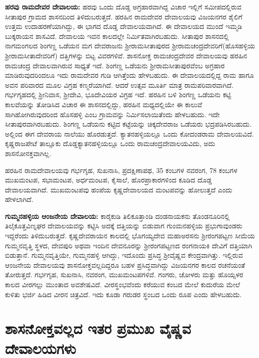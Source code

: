 \textbf{ಹರವು ರಾಮದೇವರ ದೇವಾಲಯ:} ಹರವು ಒಂದು ದೊಡ್ಡ ಅಗ್ರಹಾರವಾಗಿದ್ದ ವಿಚಾರ ಇಲ್ಲಿಗೆ ಸಮೀಪದಲ್ಲಿರುವ ಸೀತಾಪುರ ಗ್ರಾಮದ ಶಾಸನದಿಂದ ತಿಳಿದುಬರುತ್ತದೆ. ಹರಹಿನ ರಾಮದೇವರ ದೇವಾಲಯವು ವಿಜಯನಗರ ಶೈಲಿಗೆ ಉತ್ತಮ ಉದಾಹರಣೆಯಾಗಿದ್ದು, ಈ ಭಾಗದ ದೊಡ್ಡ ದೇವಾಲಯವಾಗಿದೆ. ಈ ದೇವಾಲಯದ ಮುಂದೆ ಇಮ್ಮಡಿ ಬುಕ್ಕರಾಯನ ಶಾಸವಿದೆ. ದೇವಾಲಯ ಇವನ ಕಾಲದಲ್ಲೇ ನಿರ್ಮಿತವಾಗಿರಬಹುದು. ಸೀತಾಪುರ ಶಾಸನದಲ್ಲಿ ನಾಗಮಂಗಲದ ಶಿಂಗಣ್ಣ ಒಡೆಯನ ಮಗ ದೇವರಾಜನು ಶ‍್ರೀರಾಮಸೀತಾಪುರದ ಶ‍್ರೀರಾಮಚಂದ್ರದೇವರಿಗೆ(ಹೊಸಹಳ್ಳಿಯ ಶ‍್ರೀರಾಮಸೀತಾದೇವರಿಗೆ) ದತ್ತಿಗಳನ್ನು ಬಿಟ್ಟ ವಿವರಗಳಿವೆ. ಶಾಸನೋಕ್ತ ರಾಮಚಂದ್ರದೇವರ ದೇವಾಲಯವು ಹರಹಿನ ರಾಮಚಂದ್ರ ದೇವಾಲವಾಗಿರುವ ಸಾಧ್ಯತೆ ಇದೆ. ಶಿಂಗಣ್ಣ ಒಡೆಯನು ಶ‍್ರೀರಾಮಸೀತಾಪುರವೆಂಬ ಅಗ್ರಹಾರ ಮಾಡಿರುವುದರಿಂದಲೂ ಇದು ರಾಮದೇವರ ಗುಡಿ ಆಗಿತ್ತೆಂದು ಹೇಳಬಹುದು. ಈ ದೇವಾಲಯದಲ್ಲಿದ್ದ ರಾಮ ಹಾಗೂ ಅವನ ಪರಿವಾರದ ಮೂಲ ವಿಗ್ರಹ ಕಣ್ಮರೆಯಾಗಿದೆ. ಆದರೆ ಉತ್ಸವ ಮೂರ್ತಿ ಮಾತ್ರ ರಾಮಪರಿವಾರವಾಗಿದೆ. ಗರ್ಭಗೃಹದಲ್ಲಿ ಶ‍್ರೀನಿವಾಸ, ಶ‍್ರೀದೇವಿ, ಭೂದೇವಿಯರ ವಿಗ್ರಹ ಇದೆ. ಹರಹಿನ ಬಳಿ ಶಿಂಗಣ್ಣ ಒಡೆಯನು ಕಟ್ಟಿ ಕಾಲವೆಯನ್ನು ತೋಡಿಸಿದ ವಿಚಾರ ಈ ಶಾಸನದಲ್ಲಿದ್ದು, ಹರಹಿನ ಮಧ್ಯದಲ್ಲಿಯೇ ಈ ಕಾಲುವೆ ಸಾಗಿಹೋಗಿರುವುದರಿಂದ ಹೊಸಹಳ್ಳಿ ಎಂಬ ಗ್ರಾಮವನ್ನು ನಿರ್ಮಿಸಲಾಯಿತೆಂದು ಹೇಳಬಹುದು. ಇದೇ ಸೀತಾಪುರವಾಗಿರಬಹುದು. ಶಿಂಗಣ್ಣ ಒಡೆಯನು ಕಟ್ಟಿದ ಕಟ್ಟೆಯನ್ನು ಚಿಕ್ಕದೇವರಾಜ ಒಡೆಯರು ಭದ್ರಪಡಿಸಿರಬಹುದು. ಅಲ್ಲಿಂದ ಈಗ ದೇವರಾಯ ನಾಲೆಯು ಹೊರಡುತ್ತದೆ. ಕ್ಯಾತನಹಳ್ಳಿಯಲ್ಲೂ ಒಂದು ಕೋದಂಡರಾಮ ದೇವಾಲಯವಿದೆ. ಕೃಷ್ಣರಾಜಪೇಟೆ ತಾಲ್ಲೂಕು ದೊಡ್ಡಕ್ಯಾತನಹಳ್ಳಿಯಲ್ಲೂ ಒಂದು ರಾಮಚಂದ್ರದೇವಾಲಯವಿದು, ಅದು ಶಾಸನೋನಕ್ತವಾಗಿಲ್ಲ.

ಹರಹಿನ ರಾಮದೇವಾಲಯವು ಗರ್ಭಗೃಹ, ಸುಖನಾಸಿ, ಪ್ರದಕ್ಷಿಣಾಪಥ, 35 ಕಂಬಗಳ ನವರಂಗ, 78 ಕಂಬಗಳ ಮುಖಮಂಟಪ, ಸಭಾಮಂಟಪ, ಅರ್ಧಮಂಟಪ, ಕೈಸಾಲೆ, ಹೊರಪ್ರಾಕಾರಗಳಿಂದ ಕೂಡಿದ ದೊಡ್ಡ ದೇವಾಲಯವಾಗಿದೆ. ಮುಖಮಂಟಪವು ಹಂಪೆಯ ಕೃಷ್ಣದೇವಾಲಯದ ಮಂಟಪವನ್ನು ಹೋಲುತ್ತದೆ ಎಂದು ಹೇಳಲಾಗಿದೆ.

\textbf{ಗುಮ್ಮನಹಳ್ಳಿಯ ಆಂಜನೇಯ ದೇವಾಲಯ: } ಕಾರೈಕುಡಿ ತಿಲಿಕೂತ್ತಾಂಡಿ ದಂಡನಾಯಕನು ತೊಂಡನೂರಿನಲ್ಲಿ ತಿಲೈಕೂತ್ತವಿಣ್ನಘರ ದೇವಾಲಯವನ್ನು ಕಟ್ಟಿಸಿ ಅದಕ್ಕೆ ದತ್ತಿಯನ್ನು ಬಿಡುವಾಗ ಗುಂಮನಹಳ್ಳಿಯ ಪ್ರಭುಗಾವುಂಡರು ಇದ್ದರೆಂದು ತಿಳಿದುಬರುತ್ತದೆ. ಕೃಷ್ಣದೇವರಾಯನ ಕಾಲದಲ್ಲಿ ಭೊಗಯ್ಯದೇವ ಮಹಾಅರಸನು ಶ‍್ರೀರಂಗಪಟ್ಟಣ ಸೀಮೆಯ ಗುಮ್ಮನವೃತ್ತಿ ಸ್ಥಳದ, ದೇವಪುರಿ ಅಥವಾ ಇಂದಿನ ದೇವನೂರನ್ನು ಶ‍್ರೀರಂಗಪಟ್ಟಣದ ರಂಗನಾಯಕಿ ದೇವಿಗೆ ದತ್ತಿಯಾಗಿ ಬಿಡುತ್ತಾನೆ. ಗುಮ್ಮನವೃತ್ತಿಯೇ, ಗುಮ್ಮನಹಳ್ಳಿ ಆಗಿದ್ದು, ಇದೊಂದು ಪ್ರಸಿದ್ಧ ಶ‍್ರೀವೈಷ್ಣವ ಕೇಂದ್ರವಾಗಿತ್ತು. ಇಲ್ಲಿರುವ ಆಂಜನೇಯ ದೇವಾಲಯವು ಶಾಸನೋಕ್ತವಲ್ಲದಿದ್ದರೂ ಬಹಳ ಪ್ರಸಿದ್ಧವಾಗಿದ್ದು ವಿಜಯನಗರ ಕಾಲದ ರಚನೆಯಂತೆ ತೋರುತ್ತದೆ. ಗರ್ಭಗೃಹ, ಸುಖನಾಸಿ, ನವರಂಗ, ಮುಖಮಂಟಪಗಳಿವೆ. ಗಂಗರು, ಚೋಳರು ಮತ್ತು ಹೊಯ್ಸಳರ ಕಾಲದ ವೀರಗಲ್ಲು ಮುಂತಾದ ಅವಶೇಷವಿದೆ. ವೀರಸ್ಥಂಭವೆಂದು ಕರೆಯುವ ಕಂಬದ ಮೇಲೆ ಕುದುರೆಯ ಮೇಲೆ ಕುಳಿತು ಭರ್ಜಿ ಹಿಡಿದ ವೀರನ ಚಿತ್ರವಿದೆ. ಇದು ಕೂಡಾ ಗರುಡರ ಸ್ಥಂಬದ ಒಂದು ರೂಪ ಎಂದು ಹೇಳಬಹುದು.


\section{ಶಾಸನೋಕ್ತವಲ್ಲದ ಇತರ ಪ್ರಮುಖ ವೈಷ್ಣವ ದೇವಾಲಯಗಳು}

